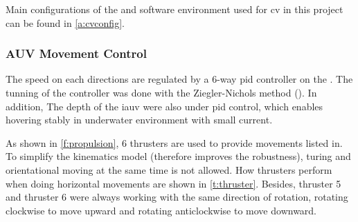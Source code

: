 Main configurations of the  and software environment used for
\gls{cv} in this project can be found in \autoref{a:cvconfig}.

\subsubsection{AUV Movement Control}

The speed on each directions are regulated by a 6-way \gls{pid} controller on
the . The tunning of the controller was done with the
Ziegler-Nichols method (\cite{aastrom2004revisiting}). In addition, The depth of
the \gls{iauv} were also under \gls{pid} control, which enables hovering stably
in underwater environment with small current.

As shown in \autoref{f:propulsion}, 6 thrusters are used to provide movements
listed in. To simplify the kinematics model (therefore improves the robustness),
turing and orientational moving at the same time is not allowed. How thrusters
perform when doing horizontal movements are shown in \autoref{t:thruster}.
Besides, thruster 5 and thruster 6 were always working with the same direction
of rotation, rotating clockwise to move upward and rotating anticlockwise to
move downward.

